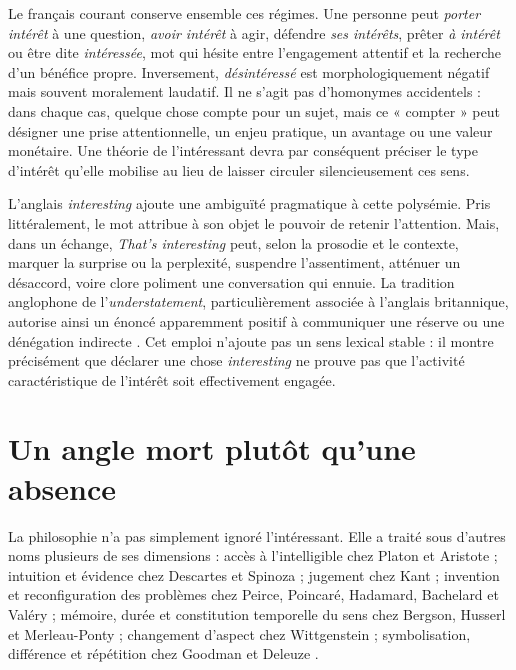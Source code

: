 \documentclass[11pt,a4paper]{article}
\begin{document}
Le français courant conserve ensemble ces régimes. Une personne peut
\emph{porter intérêt} à une question, \emph{avoir intérêt} à agir, défendre
\emph{ses intérêts}, prêter \emph{à intérêt} ou être dite \emph{intéressée},
mot qui hésite entre l'engagement attentif et la recherche d'un bénéfice propre.
Inversement, \emph{désintéressé} est morphologiquement négatif mais souvent
moralement laudatif. Il ne s'agit pas d'homonymes accidentels : dans chaque cas,
quelque chose compte pour un sujet, mais ce « compter » peut désigner une prise
attentionnelle, un enjeu pratique, un avantage ou une valeur monétaire. Une
théorie de l'intéressant devra par conséquent préciser le type d'intérêt qu'elle
mobilise au lieu de laisser circuler silencieusement ces sens.

L'anglais \emph{interesting} ajoute une ambiguïté pragmatique à cette polysémie.
Pris littéralement, le mot attribue à son objet le pouvoir de retenir
l'attention. Mais, dans un échange, \emph{That's interesting} peut, selon la
prosodie et le contexte, marquer la surprise ou la perplexité, suspendre
l'assentiment, atténuer un désaccord, voire clore poliment une conversation qui
ennuie. La tradition anglophone de l'\emph{understatement}, particulièrement
associée à l'anglais britannique, autorise ainsi un énoncé apparemment positif
à communiquer une réserve ou une dénégation indirecte
\parencite[29--30]{wierzbicka2006english}. Cet emploi n'ajoute pas un sens
lexical stable : il montre précisément que déclarer une chose
\emph{interesting} ne prouve pas que l'activité caractéristique de l'intérêt
soit effectivement engagée.

\section{Un angle mort plutôt qu'une absence}

La philosophie n'a pas simplement ignoré l'intéressant. Elle a traité sous
d'autres noms plusieurs de ses dimensions : accès à l'intelligible chez Platon
et Aristote
\parencite{platon2016republique,platon1995theetete,aristote1991metaphysique,aristote2005seconds};
intuition et évidence chez Descartes et Spinoza
\parencite{descartes2002regles,descartes1992meditations,spinoza1966ethique};
jugement chez Kant \parencite{kant2001raison,kant1993juger}; invention et
reconfiguration des problèmes chez Peirce, Poincaré, Hadamard, Bachelard et
Valéry
\parencite{peirce1955writings,poincare1908science,hadamard1959invention,bachelard1999formation,valery1973cahiers};
mémoire, durée et constitution temporelle du sens chez Bergson, Husserl et
Merleau-Ponty
\parencite{bergson2013evolution,bergson2013pensee,husserl1970experience,husserl1957logique,merleau1945phenomenologie};
changement d'aspect chez Wittgenstein \parencite{wittgenstein2004recherches};
symbolisation, différence et répétition chez Goodman et Deleuze
\parencite{goodman1976languages,deleuze1968difference}.
\end{document}

